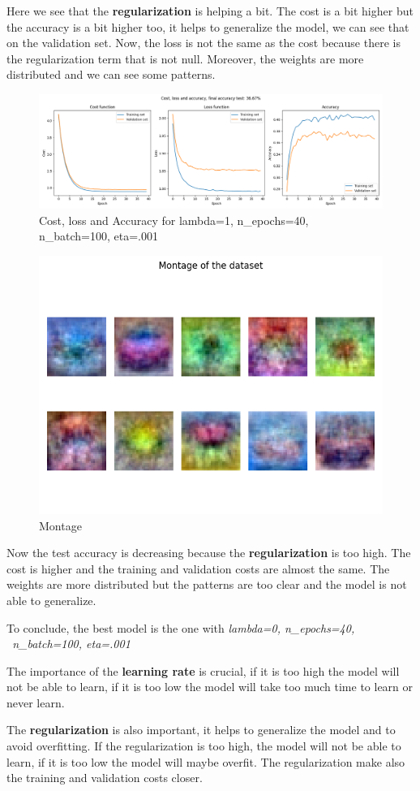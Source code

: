 \documentclass{article}
\begin{document}
Here we see that the \textbf{regularization} is helping a bit. The cost is a bit higher but the accuracy is a bit higher too, it helps to generalize the model, we can see that on the validation set. Now, the loss is not the same as the cost because there is the regularization term that is not null. Moreover, the weights are more distributed and we can see some patterns.
\begin{figure}[H]
    \centering
    \includegraphics[width=\linewidth]{Result_Pics/cost_loss_accuracy_1_40_100_0.001.png}
    \caption{Cost, loss and Accuracy for lambda=1, n\_epochs=40, n\_batch=100, eta=.001}
\end{figure}
\begin{figure}[H]
    \centering
    \includegraphics[scale=0.6]{Result_Pics/weights_1_40_100_0.001.png}
    \caption{Montage}
\end{figure}

Now the test accuracy is decreasing because the \textbf{regularization} is too high. The cost is higher and the training and validation costs are almost the same. The weights are more distributed but the patterns are too clear and the model is not able to generalize.

To conclude, the best model is the one with \textit{lambda=0, n\_epochs=40, \\ n\_batch=100, eta=.001}

The importance of the \textbf{learning rate} is crucial, if it is too high the model will not be able to learn, if it is too low the model will take too much time to learn or never learn.

The \textbf{regularization} is also important, it helps to generalize the model and to avoid overfitting. If the regularization is too high, the model will not be able to learn, if it is too low the model will maybe overfit. The regularization make also the training and validation costs closer.
\end{document}

